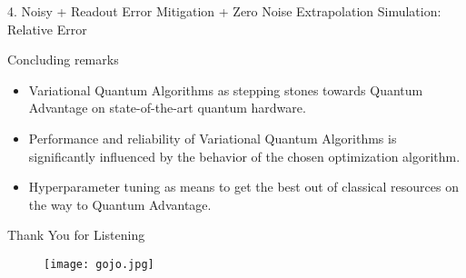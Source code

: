 \begin{frame}{4. Noisy + Readout Error Mitigation + Zero Noise Extrapolation Simulation: Relative Error}
    \vfill
    \begin{figure}
      \noindent{}
    \end{figure}
    \vfill
\end{frame}

\begin{frame}{Concluding remarks}
  \begin{itemize}
    \item Variational Quantum Algorithms as stepping stones towards Quantum Advantage on state-of-the-art quantum hardware.
    \item Performance and reliability of Variational Quantum Algorithms is significantly influenced by the behavior of the chosen optimization algorithm.
    \item Hyperparameter tuning as means to get the best out of classical resources on the way to Quantum Advantage.
  \end{itemize}
\end{frame}


\begin{frame}{Thank You for Listening}
    \begin{figure}
      \texttt{[image: gojo.jpg]}
    \end{figure}
\end{frame}
